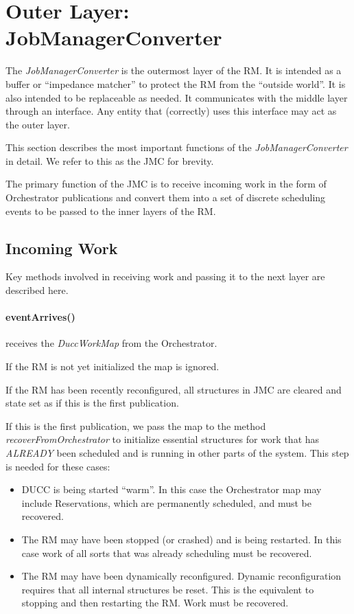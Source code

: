 \section{Outer Layer: JobManagerConverter}

    The {\em JobManagerConverter} is the outermost layer of the RM.  It is intended as a
    buffer or ``impedance matcher'' to protect the RM from the ``outside world''.  It is
    also intended to be replaceable as needed. It communicates with the middle layer through
    an interface.   Any entity that (correctly) uses this interface may act as the outer layer.

    This section describes the most important
    functions of the {\em JobManagerConverter} in detail.  We refer to this as the 
    JMC for brevity.

    The primary function of the JMC is to receive incoming work in the form of Orchestrator
    publications and convert them into a set of discrete scheduling events to be passed to the inner
    layers of the RM.

\subsection{Incoming Work}
    Key methods involved in receiving work and passing it to the next layer are described here.

    \paragraph{eventArrives()} receives the {\em DuccWorkMap} from the Orchestrator.  

     If the RM is not yet initialized the map is ignored.

     If the RM has been recently reconfigured, all structures in JMC are cleared and 
     state set as if this is the first publication.

     If this is the first publication, we pass the map to the method {\em recoverFromOrchestrator}
     to initialize essential structures for work that has {\em ALREADY} been scheduled and is
     running in other parts of the system.  This step is needed for these cases:
     \begin{itemize}
       \item DUCC is being started ``warm''.  In this case the Orchestrator map may include
         Reservations, which are permanently scheduled, and must be recovered. 
       \item The RM may have been stopped (or crashed) and is being restarted.  In this case
         work of all sorts that was already scheduling must be recovered.
       \item The RM may have been dynamically reconfigured.  Dynamic reconfiguration requires
         that all internal structures be reset.  This is the equivalent to stopping and then
         restarting the RM.  Work must be recovered.
     \end{itemize}
     

